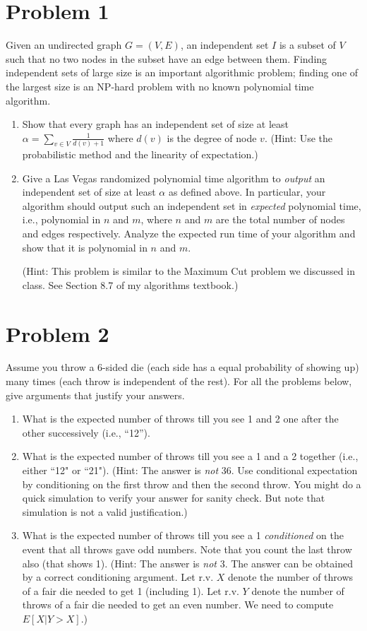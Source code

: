 \documentclass[11pt]{article}
\begin{document}
\section*{Problem 1}


Given an undirected graph $G=(V,E)$, an independent set $I$ is a subset of $V$ such that no two nodes
in the subset have an edge between them. Finding  independent sets of large size is an important algorithmic problem;
finding one of the largest size is an NP-hard problem with no known polynomial time algorithm.
\begin{enumerate}
\item Show that every graph has an independent set of size at least $ \alpha = \sum_{v \in V}\frac{1}{d(v)+1}$
where   $d(v)$ is the degree of node $v$. (Hint: Use  the probabilistic method and the linearity of expectation.)

\item Give a Las Vegas randomized polynomial time algorithm to {\em output} an independent set of size at least $\alpha$ as defined above.
In particular, your algorithm should output such an independent set in {\em expected} polynomial time, i.e., polynomial
in $n$ and $m$, where $n$ and $m$ are the total number of nodes and edges respectively. Analyze the expected run time of your algorithm and show that it is polynomial in $n$ and $m$.

(Hint: This problem is similar to the Maximum Cut problem we discussed in class. See Section 8.7 of my algorithms textbook.)  
\end{enumerate}


\section*{Problem 2} 
Assume you throw a  6-sided die (each side has a equal probability of showing up) many times (each throw is independent of the rest).
For all the problems below, give arguments that justify your answers.
\begin{enumerate}
\item What is the expected number of throws
till you see 1 and 2 one after the other successively (i.e., ``12'').  
\item What is the expected number of throws till you see a 1 and a 2 together (i.e., either ``12" or ``21").  (Hint: The answer is {\em not} 36.  Use conditional expectation by conditioning on the first throw and then the second throw. You might do a quick simulation to verify your answer for sanity check. But note that simulation is not a valid justification.)
\item What is the expected number of throws till you see a 1  {\em conditioned} on the event that all throws gave odd numbers.
Note that you count the last throw also (that shows 1). (Hint: The answer is {\em not} 3. The answer can be obtained by a correct conditioning argument. Let r.v. $X$ denote the number of throws of a fair die needed to  get 1 (including 1).
 Let r.v. $Y$ denote the number of throws of a fair die needed to get an even number.
We need to compute  $E[X|Y > X]$.)
\end{enumerate}
\end{document}
